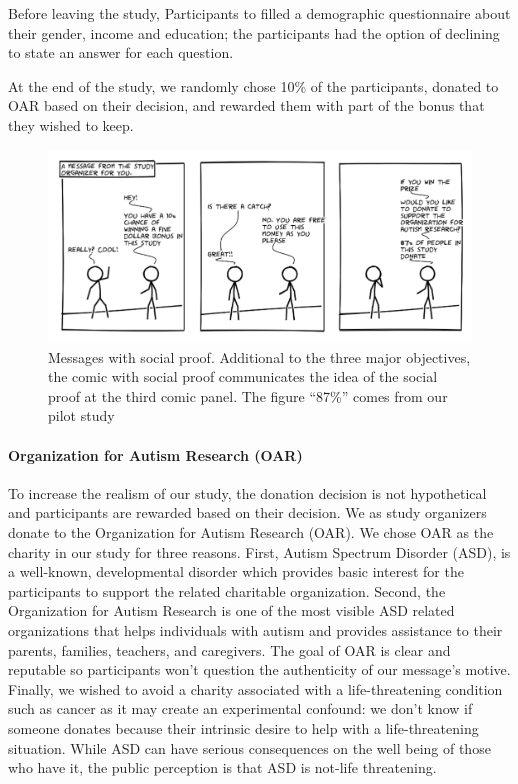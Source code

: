 Before leaving the study, Participants to filled a demographic questionnaire about their gender, income and education; the participants had the option of declining to state an answer for each question.

At the end of the study, we randomly chose 10\% of the participants, donated to OAR based on their decision, and rewarded them with part of the bonus that they wished to keep.

\begin{figure}[bt]
    \centering
    \includegraphics[width=\columnwidth]{./figures/social_proof.png}
    \caption{Messages with social proof. Additional to the three major objectives, the comic with social proof communicates the idea of the social proof at the third comic panel. The figure ``87\%'' comes from our pilot study}
    \label{fig:basic three comic social proof}
\end{figure}

\paragraph{Organization for Autism Research (OAR)}
To increase the realism of our study, the donation decision is not hypothetical and participants are rewarded based on their decision. We as study organizers donate to the Organization for Autism Research (OAR). We chose OAR as the charity in our study for three reasons. First, Autism Spectrum Disorder (ASD), is a well-known, developmental disorder which provides basic interest for the participants to support the related charitable organization. Second, the Organization for Autism Research is one of the most visible ASD related organizations that helps individuals with autism and provides assistance to their parents, families, teachers, and caregivers. The goal of OAR is clear and reputable so participants won't question the authenticity of our message's motive. Finally, we wished to avoid a charity associated with a life-threatening condition such as cancer as it may create an experimental confound: we don't know if someone donates because their intrinsic desire to help with a life-threatening situation. While ASD can have serious consequences on the well being of those who have it, the public perception is that ASD is not-life threatening. 

